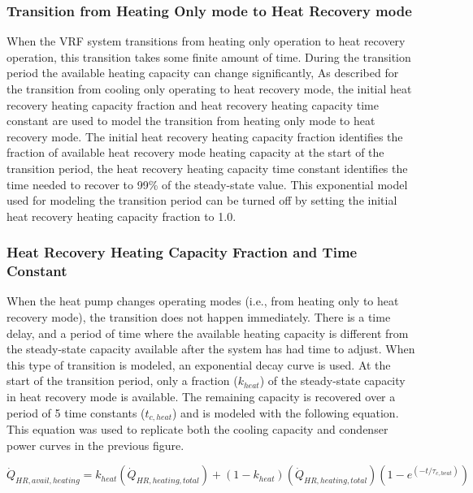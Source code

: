 \subsubsection{Transition from Heating Only mode to Heat Recovery mode}\label{transition-from-heating-only-mode-to-heat-recovery-mode}

When the VRF system transitions from heating only operation to heat recovery operation, this transition takes some finite amount of time. During the transition period the available heating capacity can change significantly, As described for the transition from cooling only operating to heat recovery mode, the initial heat recovery heating capacity fraction and heat recovery heating capacity time constant are used to model the transition from heating only mode to heat recovery mode. The initial heat recovery heating capacity fraction identifies the fraction of available heat recovery mode heating capacity at the start of the transition period, the heat recovery heating capacity time constant identifies the time needed to recover to 99\% of the steady-state value. This exponential model used for modeling the transition period can be turned off by setting the initial heat recovery heating capacity fraction to 1.0.

\subsubsection{Heat Recovery Heating Capacity Fraction and Time Constant}\label{heat-recovery-heating-capacity-fraction-and-time-constant}

When the heat pump changes operating modes (i.e., from heating only to heat recovery mode), the transition does not happen immediately. There is a time delay, and a period of time where the available heating capacity is different from the steady-state capacity available after the system has had time to adjust. When this type of transition is modeled, an exponential decay curve is used. At the start of the transition period, only a fraction (\(k_{heat}\)) of the steady-state capacity in heat recovery mode is available. The remaining capacity is recovered over a period of 5 time constants (\(t_{c,heat}\)) and is modeled with the following equation. This equation was used to replicate both the cooling capacity and condenser power curves in the previous figure.

\begin{equation}
  \dot{Q}_{HR,avail,heating} = k_{heat} \left( \dot{Q}_{HR,heating,total} \right) + \left( 1 - k_{heat} \right) \left( \dot{Q}_{HR,heating,total} \right) \left( 1 - e^{\left( -t / \tau_{c,heat} \right)} \right)
\end{equation}

